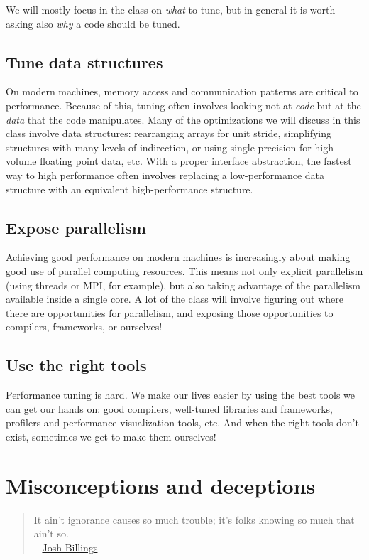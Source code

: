 \documentclass[12pt, leqno]{article} %
\begin{document}
We will mostly focus in the class on \emph{what} to tune, but in general
it is worth asking also \emph{why} a code should be tuned.

\subsection{Tune data structures}

On modern machines, memory access and communication patterns are
critical to performance. Because of this, tuning often involves looking
not at \emph{code} but at the \emph{data} that the code manipulates.
Many of the optimizations we will discuss in this class involve data
structures: rearranging arrays for unit stride, simplifying structures
with many levels of indirection, or using single precision for
high-volume floating point data, etc. With a proper interface
abstraction, the fastest way to high performance often involves
replacing a low-performance data structure with an equivalent
high-performance structure.

\subsection{Expose parallelism}

Achieving good performance on modern machines is increasingly about
making good use of parallel computing resources. This means not only
explicit parallelism (using threads or MPI, for example), but also
taking advantage of the parallelism available inside a single core. A
lot of the class will involve figuring out where there are opportunities
for parallelism, and exposing those opportunities to compilers,
frameworks, or ourselves!

\subsection{Use the right tools}

Performance tuning is hard. We make our lives easier by using the best
tools we can get our hands on: good compilers, well-tuned libraries and
frameworks, profilers and performance visualization tools, etc. And when
the right tools don't exist, sometimes we get to make them ourselves!

\section{Misconceptions and deceptions}

\begin{quote}
It ain't ignorance causes so much trouble; it's folks knowing so much
that ain't so.\\--
\href{http://www.famous-quotes.com/author.php?page=3\&total=81\&aid=733}{Josh
Billings}
\end{quote}
\end{document}
